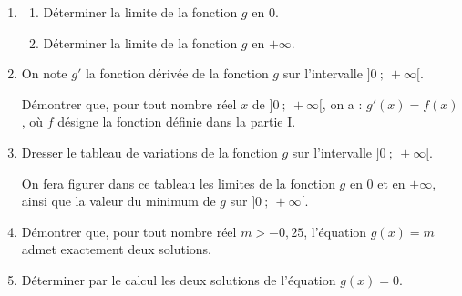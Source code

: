 \documentclass[10pt]{article}
\begin{document}
\begin{enumerate}
\item 
	\begin{enumerate}
		\item Déterminer la limite de la fonction $g$ en $0$.
		\item Déterminer la limite de la fonction $g$ en $+ \infty$.
	\end{enumerate}
\item On note $g'$ la fonction dérivée de la fonction $g$ sur l'intervalle $]0~;~+\infty[$.

Démontrer que, pour tout nombre réel $x$ de $]0~;~+\infty[$, on a : $g'(x) = f(x)$, où $f$ désigne la fonction définie dans la partie I.
\item Dresser le tableau de variations de la fonction $g$ sur l'intervalle $]0~;~+\infty[$.

On fera figurer dans ce tableau les limites de la fonction $g$ en $0$ et en $+\infty$, ainsi que la valeur du minimum de $g$ sur $]0~;~+\infty[$.
\item Démontrer que, pour tout nombre réel $m > - 0,25$, l'équation $g(x) = m$ admet exactement deux solutions.
\item Déterminer par le calcul les deux solutions de l'équation $g(x) = 0$.
\end{enumerate}
\end{document}
